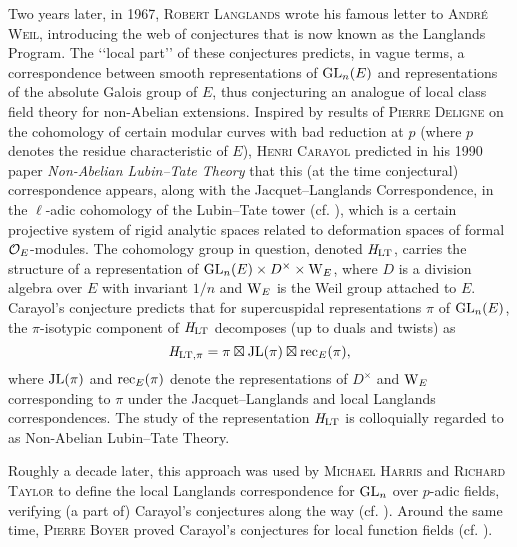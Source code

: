 \documentclass[../main.tex]{subfiles}
\begin{document}
Two years later, in 1967, \textsc{Robert Langlands} wrote his famous letter
to \textsc{André Weil}, introducing the web of conjectures that
is now known as the Langlands Program. The ‘‘local part’’ of these conjectures 
predicts, in vague terms, a correspondence between smooth representations
of $\operatorname{GL}_n(E)$ and representations of the absolute Galois group of $E$, thus
conjecturing an analogue of local class field theory for non-Abelian extensions. 
Inspired by results of \textsc{Pierre Deligne} on the cohomology of certain
modular curves with bad reduction at $p$ (where $p$ denotes the residue
characteristic of $E$), \textsc{Henri Carayol} predicted in his 1990 paper
\textit{Non-Abelian Lubin--Tate Theory} that this (at the time conjectural)
correspondence appears, along with the Jacquet--Langlands Correspondence, in
the $\ell$-adic cohomology of the Lubin--Tate tower (cf. \cite{carayol1990non}),
which is a certain projective system of rigid analytic spaces related to
deformation spaces of formal $\mathcal{O}_E$-modules.
The cohomology group in question, denoted $\mathit H_{\mathrm{LT}}$, carries the structure of a
representation of $\operatorname{GL}_n(E) \times D^\times \times \mathrm W_E$, where $D$ is a
division algebra over $E$ with invariant $1/n$ and $\mathrm W_E$ is the Weil group
attached to $E$. Carayol's conjecture predicts that for supercuspidal
representations $\pi$ of $\operatorname{GL}_n(E)$, the $\pi$-isotypic component of $\mathit H_{\mathrm{LT}}$
decomposes (up to duals and twists) as
\begin{equation*}
  \mathit H_{\mathrm{LT},\pi} = \pi \boxtimes \mathrm{JL}(\pi) \boxtimes \mathrm{rec}_E(\pi),
\end{equation*}
where $\mathrm{JL}(\pi)$ and $\mathrm{rec}_E(\pi)$ denote the representations 
of $D^\times$ and $\mathrm W_E$ corresponding to $\pi$ under the Jacquet--Langlands and 
local Langlands correspondences. The study of the representation
$\mathit H_{\mathrm{LT}}$ is colloquially regarded to as Non-Abelian Lubin--Tate Theory.

Roughly a decade later, this approach was used by \textsc{Michael Harris} and
\textsc{Richard Taylor} to define the local Langlands correspondence for
$\operatorname{GL}_n$ over $p$-adic fields, verifying (a part of)
Carayol's conjectures along the way (cf. \cite{HTShimura}). 
Around the same time, \textsc{Pierre Boyer} 
proved Carayol's conjectures for local function fields (cf.
\cite{boyer1999mauvaise}). 
\end{document}
